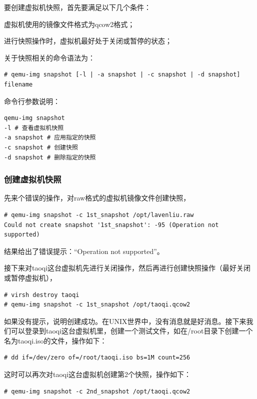 要创建虚拟机快照，首先要满足以下几个条件：

虚拟机使用的镜像文件格式为qcow2格式；

进行快照操作时，虚拟机最好处于关闭或暂停的状态；

关于快照相关的命令语法为：

\begin{verbatim}
# qemu-img snapshot [-l | -a snapshot | -c snapshot | -d snapshot] filename
\end{verbatim}

命令行参数说明：

\begin{verbatim}
qemu-img snapshot 
-l # 查看虚拟机快照
-a snapshot # 应用指定的快照
-c snapshot # 创建快照
-d snapshot # 删除指定的快照
\end{verbatim}

\subsubsection{创建虚拟机快照}
\label{sec:createVmSnapShot}

先来个错误的操作，对raw格式的虚拟机镜像文件创建快照，

\begin{verbatim}
# qemu-img snapshot -c 1st_snapshot /opt/lavenliu.raw 
Could not create snapshot '1st_snapshot': -95 (Operation not supported)
\end{verbatim}

结果给出了错误提示：“Operation not supported”。

接下来对taoqi这台虚拟机先进行关闭操作，然后再进行创建快照操作（最好关闭或暂停虚拟机），

\begin{verbatim}
# virsh destroy taoqi
# qemu-img snapshot -c 1st_snapshot /opt/taoqi.qcow2
\end{verbatim}

如果没有提示，说明创建成功。在UNIX世界中，没有消息就是好消息。接下来我们可以登录到taoqi这台虚拟机里，创建一个测试文件，如在/root目录下创建一个名为taoqi.iso的文件，操作如下：

\begin{verbatim}
# dd if=/dev/zero of=/root/taoqi.iso bs=1M count=256
\end{verbatim}

这时可以再次对taoqi这台虚拟机创建第2个快照，操作如下：

\begin{verbatim}
# qemu-img snapshot -c 2nd_snapshot /opt/taoqi.qcow2
\end{verbatim}

